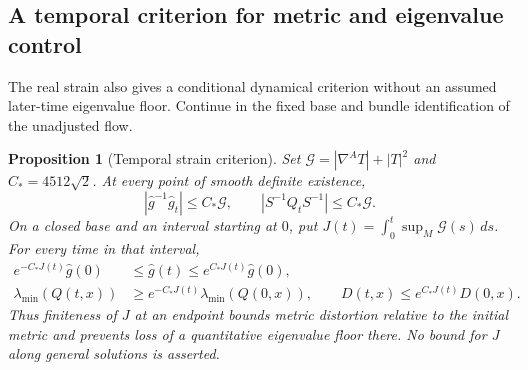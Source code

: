 \documentclass[11pt]{article}
\numberwithin{equation}{section}
\newtheorem{proposition}[theorem]{Proposition}
\theoremstyle{definition}
\theoremstyle{remark}
\begin{document}
\subsection{A temporal criterion for metric and eigenvalue control}
\label{subsec:temporal-strain}

The real strain also gives a conditional dynamical criterion without an
assumed later-time eigenvalue floor. Continue in the fixed base and bundle
identification of the unadjusted flow.

\begin{proposition}[Temporal strain criterion]
\label{prop:temporal-strain}
Set $\mathcal G=|\nabla^A T|+|T|^2$ and $C_*=4512\sqrt2$. At every point
of smooth definite existence,
\begin{equation}\label{flow:relative-velocity}
 |\widehat g^{-1}\widehat g_t|\leq C_*\mathcal G,\qquad
 |S^{-1}Q_tS^{-1}|\leq C_*\mathcal G.
\end{equation}
On a closed base and an interval starting at $0$, put $J(t)=\int_0^t\sup_M\mathcal G(s)\,ds$.
For every time in that interval,
\begin{align}
 e^{-C_*J(t)}\widehat g(0)&\leq\widehat g(t)
                         \leq e^{C_*J(t)}\widehat g(0),\nonumber\\
 \lambda_{\min}(Q(t,x))&\geq e^{-C_*J(t)}\lambda_{\min}(Q(0,x)),
 \qquad D(t,x)\leq e^{C_*J(t)}D(0,x).
 \label{flow:temporal-comparison}
\end{align}
Thus finiteness of $J$ at an endpoint bounds metric distortion relative
to the initial metric and prevents loss of a quantitative eigenvalue floor there.
No bound for $J$ along general solutions is asserted.
\end{proposition}
\end{document}
